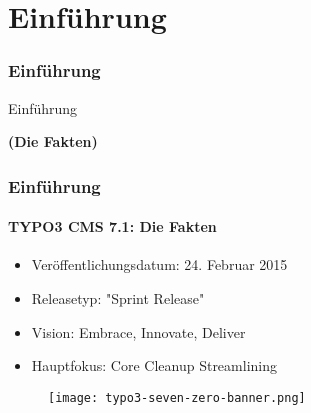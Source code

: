 %

\section{Einführung}
\begin{frame}[fragile]
	\frametitle{Einführung}

	\begin{center}\huge{Einführung}\end{center}
	\begin{center}\huge{\color{typo3darkgrey}\textbf{(Die Fakten)}}\end{center}

\end{frame}


\begin{frame}[fragile]
	\frametitle{Einführung}
	\framesubtitle{TYPO3 CMS 7.1: Die Fakten}

	\begin{itemize}
		\item Veröffentlichungsdatum: 24. Februar 2015
		\item Releasetyp: "Sprint Release"
		\item Vision: Embrace, Innovate, Deliver
		\item Hauptfokus: Core Cleanup Streamlining
	\end{itemize}

	\begin{figure}
		\texttt{[image: typo3-seven-zero-banner.png]}
	\end{figure}

\end{frame}

